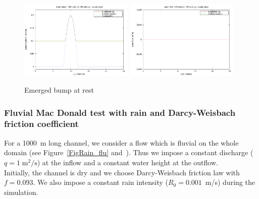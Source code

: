 \documentclass[a4paper, 11pt]{article}
\begin{document}
\begin{figure}[htbp]
	\includegraphics[width=0.48\textwidth]{Figures_FullSWOF_2D/Bump_emerged_Lake_at_rest_h}\ \includegraphics[width=0.48\textwidth]{Figures_FullSWOF_2D/Bump_emerged_Lake_at_rest_q}
	\caption{Emerged bump at rest}
	\label{FigBumpemerged}
\end{figure}

\subsubsection{Fluvial Mac Donald test with rain and Darcy-Weisbach friction coefficient}
For a 1000~m long channel, we consider a flow which is fluvial on the whole domain (see Figure~\ref{FigRain_flu} and~\citep[§~3.3.1]{Delestre13}). Thus we impose a constant discharge ($q=1\;\text{m}^2/\text{s}$) at the inflow and a constant water height at the outflow.\\
Initially, the channel is dry and we choose Darcy-Weisbach friction law with $f=0.093$. We also impose a constant rain intensity ($R_{0} = 0.001$~m/s) during the simulation.

\end{document}
